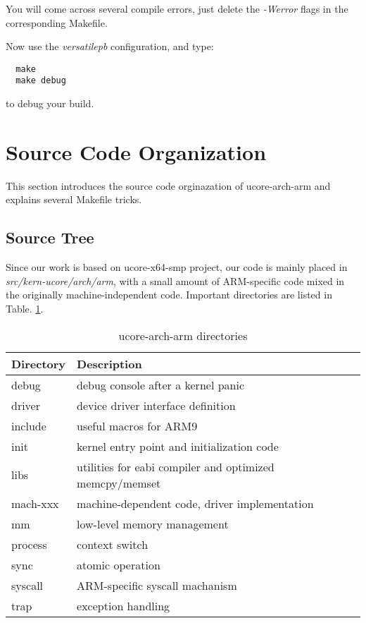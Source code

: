 \documentclass[a4paper]{article}
\begin{document}
You will come across several compile errors, just
delete the \emph{-Werror} flags in the corresponding Makefile.

Now use the \emph{versatilepb} configuration, and type:
\begin{verbatim}
  make 
  make debug
\end{verbatim}

to debug your build.

\section{Source Code Organization}
This section introduces the source code orginazation of ucore-arch-arm 
and explains several Makefile tricks.
\subsection{Source Tree}
Since our work is based on ucore-x64-smp project, our code is mainly placed
in \emph{src/kern-ucore/arch/arm}, with a small amount of ARM-specific 
code mixed in the originally machine-independent code. Important directories are listed in Table. \ref{tab:dir}.

\begin{table}[h]
  \centering
  \begin{tabular}{|l|l|}
    \hline
    Directory & Description \\
    \hline
    debug  &     debug console after a kernel panic \\
    driver &     device driver interface definition \\
    include &    useful macros for ARM9              \\
    init   &     kernel entry point and initialization code \\
    libs   &     utilities for eabi compiler and optimized memcpy/memset \\
    mach-xxx &   machine-dependent code, driver implementation \\
    mm     &     low-level memory management \\
    process   &  context switch             \\
    sync   &     atomic operation           \\
    syscall &     ARM-specific syscall machanism \\
    trap   &     exception handling  \\
    \hline
  \end{tabular}
  \caption{ucore-arch-arm directories}
  \label{tab:dir}
\end{table}
\end{document}
